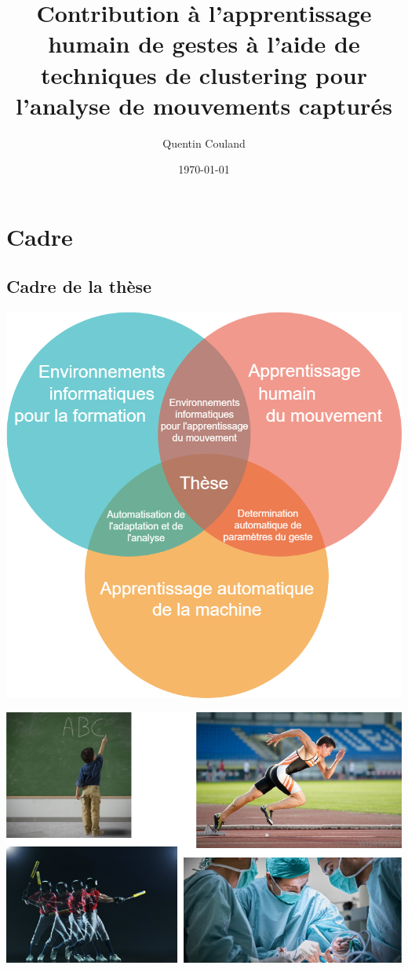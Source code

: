 \documentclass[svgnames]{beamer}
\title[]{Contribution à l'apprentissage humain de gestes à l'aide de techniques de clustering pour l’analyse de mouvements capturés}
\author{Quentin Couland}
\institute{}
\date{\today}
\begin{document}

	\section{Cadre}
	\subsection{Cadre de la thèse}
	\begin{frame}{\secname}
	\centering
		\includegraphics[scale=0.25]{img/cadre.png}
	\end{frame}
	
	\begin{frame}{\secname}
	\centering
		\includegraphics[scale=0.5]{img/motion_in_general.jpg}
	\end{frame}
\end{document}

